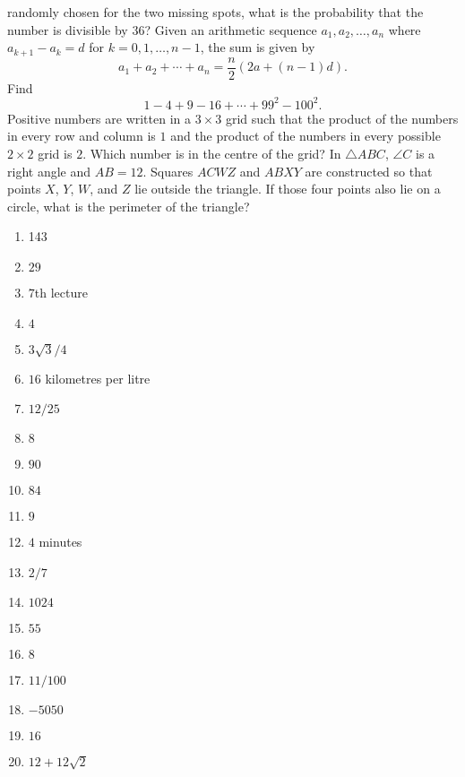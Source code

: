 \documentclass[a4paper,12pt]{exam}
\begin{document}
\begin{questions}
  randomly chosen for the two missing spots, what is the probability that the number is divisible by \(36\)?
  \question Given an arithmetic sequence \(a_1,a_2,\ldots,a_n\) where \(a_{k+1}-a_{k}=d\) for \(k=0,1,\ldots,n-1\),
  the sum is given by \[a_1+a_2+\cdots+a_n=\frac{n}{2}\left(2a+(n-1)d\right).\]
  Find \[1-4+9-16+\cdots+99^2-100^2.\]
  \question Positive numbers are written in a \(3\times3\) grid such that the product of the numbers in every row
  and column is \(1\) and the product of the numbers in every possible \(2\times2\)  grid is \(2\). Which number is in
  the centre of the grid?
  \question In \(\triangle ABC\), \(\angle C\) is a right angle and \(AB=12\). Squares \(ACWZ\) and \(ABXY\) are constructed
  so that points \(X\), \(Y\), \(W\), and \(Z\) lie outside the triangle. If those four points also lie on a circle, what is the perimeter
  of the triangle?
\end{questions}
\pagebreak
\begin{enumerate}
\item 143
\item \(29\)
\item \(7\)th lecture
\item \(4\)
\item \(3\sqrt3/4\)
\item \(16\) kilometres per litre
\item \(12/25\)
\item \(8\)
\item \(90\)
\item \(84\)
\item \(9\)
\item \(4\) minutes
\item \(2/7\)
\item \(1024\)
\item \(55\)
\item \(8\)
\item \(11/100\)
\item \(-5050\)
\item \(16\)
\item \(12+12\sqrt2\)
\end{enumerate}
\end{document}
